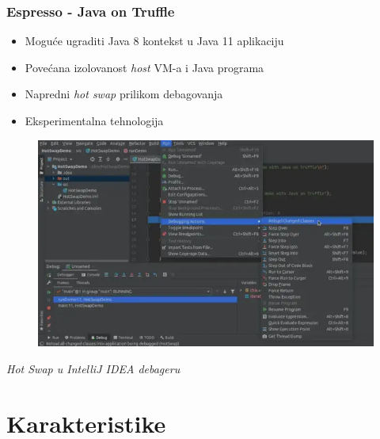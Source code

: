 \documentclass{beamer}
\begin{document}
	\begin{frame}
		\frametitle{Espresso - Java on Truffle}

		\begin{flushleft}
			\begin{itemize}
				\item Moguće ugraditi Java 8 kontekst u Java 11 aplikaciju
				\item Povećana izolovanost \emph{host} VM-a i Java programa
				\item Napredni \emph{hot swap} prilikom debagovanja
				\item Eksperimentalna tehnologija
			\end{itemize}
		\end{flushleft}


		\begin{figure}
			\begin{center}
				\includegraphics[width=0.5\linewidth]{imgs/hotswap.png}	
			\end{center} 
		\end{figure}

		\center	
		\textit{Hot Swap u IntelliJ IDEA debageru}

	\end{frame}
	
		
	\section{Karakteristike}
	
\end{document}
